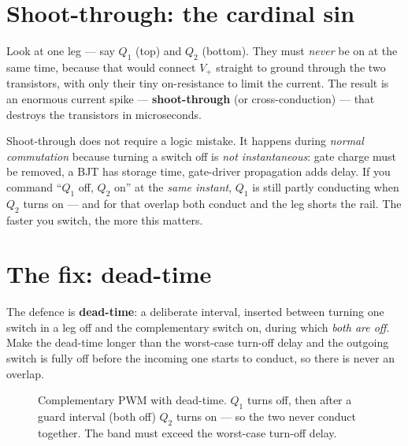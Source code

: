 \documentclass[11pt,a4paper,oneside]{book}
\begin{document}
\section{Shoot-through: the cardinal sin}
Look at one leg --- say $Q_1$ (top) and $Q_2$ (bottom). They must \emph{never} be
on at the same time, because that would connect $V_+$ straight to ground through
the two transistors, with only their tiny on-resistance to limit the current.
The result is an enormous current spike --- \textbf{shoot-through} (or
cross-conduction) --- that destroys the transistors in microseconds.

\begin{warning}
Shoot-through does not require a logic mistake. It happens during \emph{normal
commutation} because turning a switch off is \emph{not instantaneous}: gate charge
must be removed, a BJT has storage time, gate-driver propagation adds delay. If
you command ``$Q_1$ off, $Q_2$ on'' at the \emph{same instant}, $Q_1$ is still
partly conducting when $Q_2$ turns on --- and for that overlap both conduct and the
leg shorts the rail. The faster you switch, the more this matters.
\end{warning}

\section{The fix: dead-time}
The defence is \textbf{dead-time}: a deliberate interval, inserted between turning
one switch in a leg off and the complementary switch on, during which
\emph{both are off}. Make the dead-time longer than the worst-case turn-off
delay and the outgoing switch is fully off before the incoming one starts to
conduct, so there is never an overlap.

\begin{figure}[h]
\centering
{}
\caption{Complementary PWM with dead-time. $Q_1$ turns off, then after a guard
interval (both off) $Q_2$ turns on --- so the two never conduct together. The
band must exceed the worst-case turn-off delay.}
\label{fig:deadtime}
\end{figure}
\end{document}
